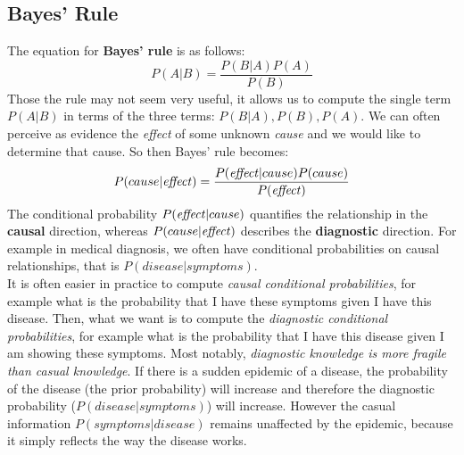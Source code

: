 \documentclass{article}
\newcommand{\n}[0]{\\[\baselineskip]}
\begin{document}
\subsection{Bayes' Rule}
The equation for \textbf{Bayes' rule} is as follows:
\begin{equation}
P(A|B) = \frac{P(B|A)P(A)}{P(B)}
\end{equation}
Those the rule may not seem very useful, it allows us to compute the single term $P(A|B)$ in terms of the three terms: $P(B|A), P(B), P(A)$. We can often perceive as evidence the \textit{effect} of some unknown \textit{cause} and we would like to determine that cause. So then Bayes' rule becomes:
\begin{equation}
P(cause|\text{\textit{effect}}) = \frac{P(\text{\textit{effect}}|cause)P(cause)}{P(\text{\textit{effect}})}
\end{equation}
The conditional probability $P(\text{\textit{effect}}|cause)$ quantifies the relationship in the \textbf{causal} direction, whereas $P(cause|\text{\textit{effect}})$ describes the \textbf{diagnostic} direction. For example in medical diagnosis, we often have conditional probabilities on causal relationships, that is $P(disease|symptoms)$.
\n
It is often easier in practice to compute \textit{causal conditional probabilities}, for example what is the probability that I have these symptoms given I have this disease. Then, what we want is to compute the \textit{diagnostic conditional probabilities}, for example what is the probability that I have this disease given I am showing these symptoms. Most notably, \textit{diagnostic knowledge is more fragile than casual knowledge}. If there is a sudden epidemic of a disease, the probability of the disease (the prior probability) will increase and therefore the diagnostic probability ($P(disease|symptoms)$) will increase. However the casual information $P(symptoms|disease)$ remains unaffected by the epidemic, because it simply reflects the way the disease works.
\end{document}
